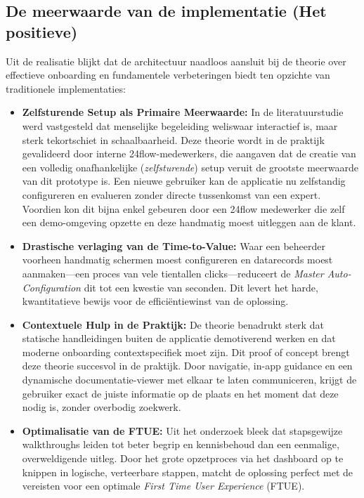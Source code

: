 \subsection{De meerwaarde van de implementatie (Het positieve)}
Uit de realisatie blijkt dat de architectuur naadloos aansluit bij de theorie over effectieve onboarding en fundamentele verbeteringen biedt ten opzichte van traditionele implementaties:

\begin{itemize}
	\item \textbf{Zelfsturende Setup als Primaire Meerwaarde:} In de literatuurstudie werd vastgesteld dat menselijke begeleiding weliswaar interactief is, maar sterk tekortschiet in schaalbaarheid. Deze theorie wordt in de praktijk gevalideerd door interne 24flow-medewerkers, die aangaven dat de creatie van een volledig onafhankelijke (\textit{zelfsturende}) setup veruit de grootste meerwaarde van dit prototype is. Een nieuwe gebruiker kan de applicatie nu zelfstandig configureren en evalueren zonder directe tussenkomst van een expert. Voordien kon dit bijna enkel gebeuren door een 24flow medewerker die zelf een demo-omgeving opzette en deze handmatig moest uitleggen aan de klant.
	
	\item \textbf{Drastische verlaging van de Time-to-Value:} Waar een beheerder voorheen handmatig schermen moest configureren en datarecords moest aanmaken—een proces van vele tientallen clicks—reduceert de \textit{Master Auto-Configuration} dit tot een kwestie van seconden. Dit levert het harde, kwantitatieve bewijs voor de efficiëntiewinst van de oplossing. 
	
	\item \textbf{Contextuele Hulp in de Praktijk:} De theorie benadrukt sterk dat statische handleidingen buiten de applicatie demotiverend werken en dat moderne onboarding contextspecifiek moet zijn. Dit proof of concept brengt deze theorie succesvol in de praktijk. Door navigatie, in-app guidance en een dynamische documentatie-viewer met elkaar te laten communiceren, krijgt de gebruiker exact de juiste informatie op de plaats en het moment dat deze nodig is, zonder overbodig zoekwerk.
	
	\item \textbf{Optimalisatie van de FTUE:} Uit het onderzoek bleek dat stapsgewijze walkthroughs leiden tot beter begrip en kennisbehoud dan een eenmalige, overweldigende uitleg. Door het grote opzetproces via het dashboard op te knippen in logische, verteerbare stappen, matcht de oplossing perfect met de vereisten voor een optimale \textit{First Time User Experience} (FTUE).
	

\end{itemize}
